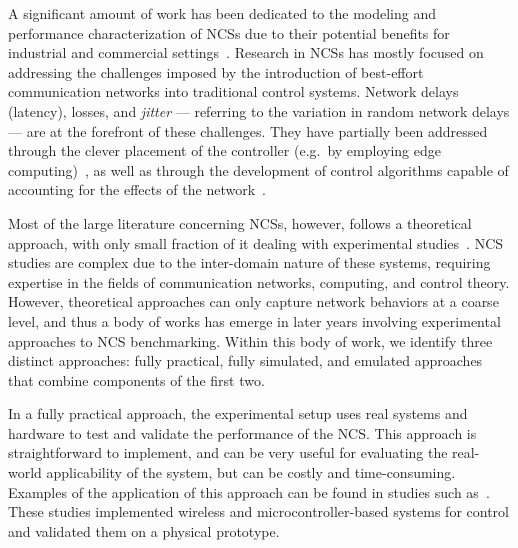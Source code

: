 A significant amount of work has been dedicated to the modeling and performance characterization of \glspl{NCS} due to their potential benefits for industrial and commercial settings~\cite{lu2016real,hespanha2007survey,zhang2013network,zhang2016survey}.
Research in \glspl{NCS} has mostly focused on addressing the challenges imposed by the introduction of best-effort communication networks into traditional control systems.
Network delays (latency), losses, and \emph{jitter} --- referring to the variation in random network delays --- are at the forefront of these challenges.
They have partially been addressed through the clever placement of the controller (e.g.\ by employing edge computing)~\cite{sasaki2017layered,sasaki2016vehicle}, as well as through the development of control algorithms capable of accounting for the effects of the network~\cite{zhang2013network}.

Most of the large literature concerning \glspl{NCS}, however, follows a theoretical approach, with only small fraction of it dealing with experimental studies~\cite{zhang2019networked}.
\gls{NCS} studies are complex due to the inter-domain nature of these systems, requiring expertise in the fields of communication networks, computing, and control theory.
However, theoretical approaches can only capture network behaviors at a coarse level, and thus a body of works has emerge in later years involving experimental approaches to \gls{NCS} benchmarking.
Within this body of work, we identify three distinct approaches: fully practical, fully simulated, and emulated approaches that combine components of the first two.

In a fully practical approach, the experimental setup uses real systems and hardware to test and validate the performance of the \gls{NCS}.
This approach is straightforward to implement, and can be very useful for evaluating the real-world applicability of the system, but can be costly and time-consuming.
Examples of the application of this approach can be found in studies such as~\cite{drew2005networked,baumann2018evaluating,li2014wireless,cuenca2019periodic}.
These studies implemented wireless and microcontroller-based systems for control and validated them on a physical prototype.

